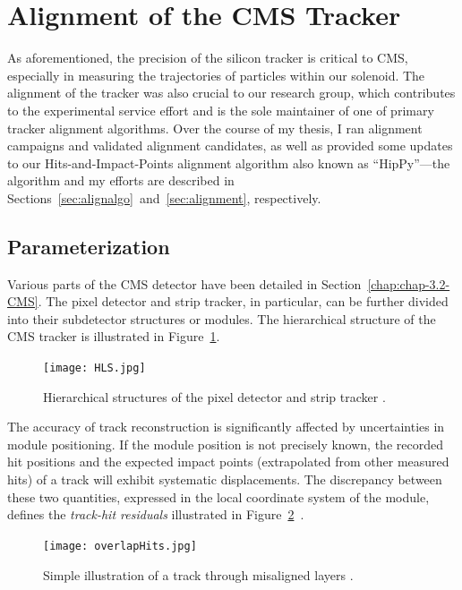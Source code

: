 \section{Alignment of the CMS Tracker}

As aforementioned, the precision of the silicon tracker is critical to CMS, especially in measuring the trajectories of particles within our solenoid. The alignment of the tracker was also crucial to our research group, which contributes to the experimental service effort and is the sole maintainer of one of primary tracker alignment algorithms. Over the course of my thesis, I ran alignment campaigns and validated alignment candidates, as well as provided some updates to our Hits-and-Impact-Points alignment algorithm also known as ``HipPy''---the algorithm and my efforts are described in Sections~\ref{sec:alignalgo}~and~\ref{sec:alignment}, respectively.

\subsection{Parameterization}

Various parts of the CMS detector have been detailed in Section~\ref{chap:chap-3.2-CMS}. The pixel detector and strip tracker, in particular, can be further divided into their subdetector structures or modules. The hierarchical structure of the CMS tracker is illustrated in Figure~\ref{fig:HLS}. 

\begin{figure}[!hbt]
    \begin{center}
        \texttt{[image: HLS.jpg]}
        \caption{Hierarchical structures of the pixel detector and strip tracker \cite{WAdam_2009}.}
        \label{fig:HLS}
    \end{center}
\end{figure}

The accuracy of track reconstruction is significantly affected by uncertainties in module positioning. If the module position is not precisely known, the recorded hit positions and the expected impact points (extrapolated from other measured hits) of a track will exhibit systematic displacements. The discrepancy between these two quantities, expressed in the local coordinate system of the module, defines the \emph{track-hit residuals} illustrated in Figure~\ref{fig:overlapHits}~\cite{Karimaki:926537}.  

\begin{figure}[!hbt]
    \begin{center}
        \texttt{[image: overlapHits.jpg]}
        \caption{Simple illustration of a track through misaligned layers \cite{2022166795}.}
        \label{fig:overlapHits}
    \end{center}
\end{figure}

